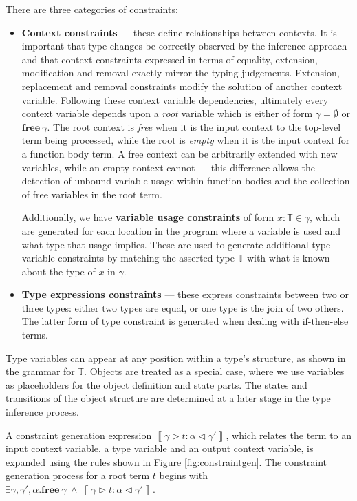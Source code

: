 \documentclass[preprint]{sigplanconf}
\newcommand{\figref}[1]{Figure \ref{#1}}
\newcommand{\inferlhs}[1]{\left\llbracket \gamma \triangleright #1 : \alpha \triangleleft \gamma' \right\rrbracket}
\newcommand{\cand}{\:\wedge\:}
\newcommand{\free}[1]{\mathbf{free}\:#1}
\newcommand{\tinf}{\mathbb{T}}
\begin{document}
There are three categories of constraints:

\begin{itemize}
\item {\bf Context constraints} --- these define relationships between contexts.
It is important that type changes be correctly observed by the inference
approach and that context constraints expressed in terms of equality, extension,
modification and removal exactly mirror the typing judgements. 
Extension, replacement and removal constraints modify the solution of
another context variable. Following these context variable dependencies,
ultimately every context variable depends upon a {\it root} variable which
is either of form $\gamma = \emptyset$ or $\free{\gamma}$. The root
context is {\it free} when it is the input context to the top-level term being
processed, while
the root is {\it empty} when it is the input context for a function body term.
A free context can be arbitrarily extended with new variables, while an
empty context cannot --- this difference allows the detection of unbound
variable usage within function bodies and the collection of free variables
in the root term.

Additionally, we have {\bf variable usage constraints} of form 
$x : \tinf \in \gamma$, which are generated for each location in the
program where a variable is used and what type that usage implies. These
are used to generate additional type variable
constraints by matching the asserted type $\tinf$ with what is known
about the type of $x$ in $\gamma$.

\item {\bf Type expressions constraints} --- these express 
constraints between two or three types: either two types are equal,
or one type is the join of two others. The latter form of type constraint
is generated when dealing with if-then-else terms.
\end{itemize}

Type variables can appear at any position within a type's structure, as shown
in the grammar for $\tinf$. Objects are treated as a special case, where
we use variables as placeholders for the object definition and state parts.
The states and transitions of the object structure are determined at a later
stage in the type inference process.

A constraint generation expression $\inferlhs{t}$, which relates the term
to an input context variable, a type variable and an output context variable, 
is expanded using the rules shown in \figref{fig:constraintgen}.
The constraint generation process for a root term $t$ begins with
$\exists \gamma, \gamma', \alpha. \free{\gamma} \cand \inferlhs{t}$.
\end{document}
